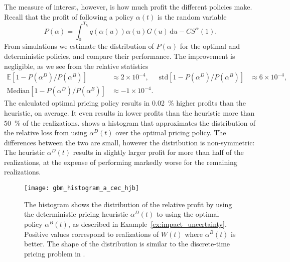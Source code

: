 \documentclass[main.tex]{subfiles}
\begin{document}
\begin{example}
  The measure of interest, however, is how much profit the different
  policies make. Recall that the profit of following a policy
  $\alpha(t)$ is the random variable
  \begin{equation}
    P(\alpha)=\int_0^{T_h}q(\alpha(u))\alpha(u)G(u)\,\mathrm{d}u-CS^\alpha(1).
  \end{equation}
  From simulations we estimate the distribution of $P(\alpha)$ for the
  optimal and deterministic policies, and compare their performance.
  The improvement is negligible, as we see from the relative statistics
  \begin{align}
    \mathbb E\left[1-P(\alpha^D)/P(\alpha^B)\right]
    &\approx 2\times 10^{-4},
    &\mbox{std}\left[1-P(\alpha^D)/P(\alpha^B)\right]
    &\approx 6\times 10^{-4},\\
    \mbox{Median}\left[1-P(\alpha^D)/P(\alpha^B)\right]
    &\approx -1\times 10^{-4}.
  \end{align}
  The calculated optimal pricing policy results in \SI{0.02}{\percent} higher profits
  than the heuristic, on average. It even results in lower profits than the
  heuristic more than \SI{50}{\percent} of the realizations.
   shows a histogram that approximates
  the distribution of the relative loss from using $\alpha^D(t)$
  over the optimal pricing policy. The differences between the two are
  small, however the distribution is non-symmetric:
  The heuristic $\alpha^D(t)$ results in slightly larger profit for more
  than half of
  the realizations, at the expense of performing markedly worse for the remaining realizations.
  \begin{figure}[htb]
    \centering
    \texttt{[image: gbm\_histogram\_a\_cec\_hjb]}
    \caption{The histogram shows the distribution of the relative
      profit by using the deterministic pricing heuristic $\alpha^D(t)$
      to using the optimal policy $\alpha^B(t)$, as described in
      Example~\ref{ex:impact_uncertainty}. %
      Positive values
      correspond to realizations of $W(t)$ where
      $\alpha^B(t)$ is better.
      The shape of the distribution is similar to the discrete-time pricing problem
      in .
    }\label{fig:gbm_histogram_a_cec_hjb}
  \end{figure}
\end{example}
\end{document}
